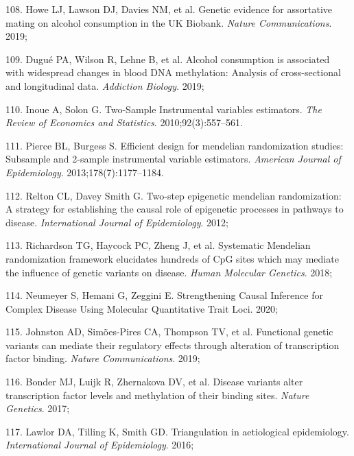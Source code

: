 \documentclass[11pt,oneside]{bristolthesis}
\newenvironment{cslreferences}%
  {}%
  {\par}
\begin{document}
\begin{cslreferences}
\leavevmode\hypertarget{ref-Howe2019}{}%
108. Howe LJ, Lawson DJ, Davies NM, et al. Genetic evidence for assortative mating on alcohol consumption in the UK Biobank. \emph{Nature Communications}. 2019;

\leavevmode\hypertarget{ref-Dugue2019}{}%
109. Dugué PA, Wilson R, Lehne B, et al. Alcohol consumption is associated with widespread changes in blood DNA methylation: Analysis of cross-sectional and longitudinal data. \emph{Addiction Biology}. 2019;

\leavevmode\hypertarget{ref-Inoue2010}{}%
110. Inoue A, Solon G. Two-Sample Instrumental variables estimators. \emph{The Review of Economics and Statistics}. 2010;92(3):557--561.

\leavevmode\hypertarget{ref-Pierce2013}{}%
111. Pierce BL, Burgess S. Efficient design for mendelian randomization studies: Subsample and 2-sample instrumental variable estimators. \emph{American Journal of Epidemiology}. 2013;178(7):1177--1184.

\leavevmode\hypertarget{ref-Relton2012}{}%
112. Relton CL, Davey Smith G. Two-step epigenetic mendelian randomization: A strategy for establishing the causal role of epigenetic processes in pathways to disease. \emph{International Journal of Epidemiology}. 2012;

\leavevmode\hypertarget{ref-Richardson2018}{}%
113. Richardson TG, Haycock PC, Zheng J, et al. Systematic Mendelian randomization framework elucidates hundreds of CpG sites which may mediate the influence of genetic variants on disease. \emph{Human Molecular Genetics}. 2018;

\leavevmode\hypertarget{ref-Neumeyer2020}{}%
114. Neumeyer S, Hemani G, Zeggini E. Strengthening Causal Inference for Complex Disease Using Molecular Quantitative Trait Loci. 2020;

\leavevmode\hypertarget{ref-Johnston2019}{}%
115. Johnston AD, Simões-Pires CA, Thompson TV, et al. Functional genetic variants can mediate their regulatory effects through alteration of transcription factor binding. \emph{Nature Communications}. 2019;

\leavevmode\hypertarget{ref-Bonder2017}{}%
116. Bonder MJ, Luijk R, Zhernakova DV, et al. Disease variants alter transcription factor levels and methylation of their binding sites. \emph{Nature Genetics}. 2017;

\leavevmode\hypertarget{ref-Lawlor2016}{}%
117. Lawlor DA, Tilling K, Smith GD. Triangulation in aetiological epidemiology. \emph{International Journal of Epidemiology}. 2016;


\end{cslreferences}
\end{document}
